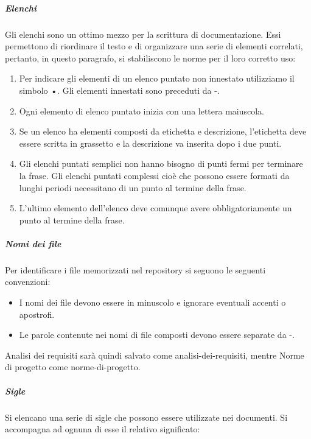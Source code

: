 \documentclass[../norme-di-progetto.tex]{subfiles}
\begin{document}
\subparagraph{Elenchi }%
\label{subp:elenchi}
Gli elenchi sono un ottimo mezzo per la scrittura di documentazione. Essi permettono di riordinare il testo e di organizzare una serie di elementi correlati, pertanto, in questo paragrafo, si stabiliscono le norme per il loro corretto uso:

\begin{enumerate}
  \item Per indicare gli elementi di un elenco puntato non innestato utilizziamo il simbolo •. Gli elementi innestati sono preceduti da -.
  \item Ogni elemento di elenco puntato inizia con una lettera maiuscola.
  \item Se un elenco ha elementi composti da etichetta e descrizione, l'etichetta deve essere scritta in grassetto e la descrizione va inserita dopo i due punti.
  \item Gli elenchi puntati semplici non hanno bisogno di punti fermi per terminare la frase. Gli elenchi puntati complessi cioè che possono essere formati da lunghi periodi necessitano di un punto al termine della frase.
  \item L'ultimo elemento dell'elenco deve comunque avere obbligatoriamente un punto al termine della frase.
\end{enumerate}

\subparagraph{Nomi dei file}%
\label{nomi_dei_file}
Per identificare i file memorizzati nel repository si seguono le seguenti convenzioni:

\begin{itemize}
  \item I nomi dei file devono essere in minuscolo e ignorare eventuali accenti o apostrofi.
  \item Le parole contenute nei nomi di file composti devono essere separate da -.
\end{itemize}

Analisi dei requisiti sarà quindi salvato come analisi-dei-requisiti, mentre Norme di progetto come norme-di-progetto.

\subparagraph{Sigle}%
\label{subp:sigle}
Si elencano una serie di sigle che possono essere utilizzate nei documenti. Si accompagna ad ognuna di esse il relativo significato:
\end{document}
